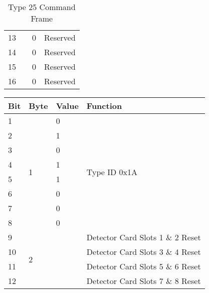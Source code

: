 \documentclass[]{article}
\begin{document}
\begin{table}[ht]
\begin{tabular}{llll}
		13           &                    & 0                 & Reserved                         \\
		14           &                    & 0                 & Reserved                         \\
		15           &                    & 0                 & Reserved                         \\
		16           &                    & 0                 & Reserved                         \\ \hline
	\end{tabular}
	\caption{Type 25 Command Frame}
	\label{tab:type-25-frame}
\end{table}

\begin{table}[ht]
	\centering
	\begin{tabular}{llll}
		\hline
		\textbf{Bit} & \textbf{Byte}      & \textbf{Value}    & \textbf{Function}                \\ \hline
		1            & \multirow{8}{*}{1} & 0                 & \multirow{8}{*}{Type ID 0x1A}    \\
		2            &                    & 1                 &                                  \\
		3            &                    & 0                 &                                  \\
		4            &                    & 1                 &                                  \\
		5            &                    & 1                 &                                  \\
		6            &                    & 0                 &                                  \\
		7            &                    & 0                 &                                  \\
		8            &                    & 0                 &                                  \\ \hline
		9            & \multirow{8}{*}{2} & \multirow{4}{*}{} & Detector Card Slots 1 \& 2 Reset \\
		10           &                    &                   & Detector Card Slots 3 \& 4 Reset \\
		11           &                    &                   & Detector Card Slots 5 \& 6 Reset \\
		12           &                    &                   & Detector Card Slots 7 \& 8 Reset \\ \cline{3-4} 

\end{tabular}
\end{table}
\end{document}
